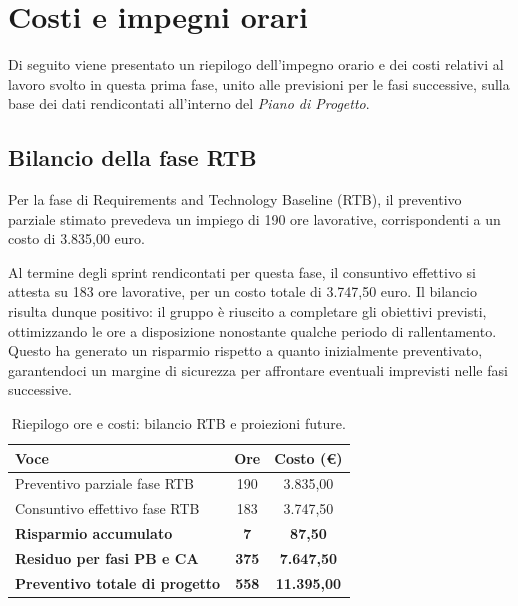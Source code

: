 \documentclass[11pt,a4paper]{article}
\begin{document}
\newpage
\section{Costi e impegni orari}
Di seguito viene presentato un riepilogo dell'impegno orario e dei costi relativi al lavoro svolto in questa prima fase, unito alle previsioni per le fasi successive, sulla base dei dati rendicontati all'interno del \textit{Piano di Progetto}.

\subsection*{Bilancio della fase RTB}
Per la fase di Requirements and Technology Baseline (RTB), il preventivo parziale stimato prevedeva un impiego di 190 ore lavorative, corrispondenti a un costo di 3.835,00 euro. 

Al termine degli sprint rendicontati per questa fase, il consuntivo effettivo si attesta su 183 ore lavorative, per un costo totale di 3.747,50 euro. Il bilancio risulta dunque positivo: il gruppo è riuscito a completare gli obiettivi previsti, ottimizzando le ore a disposizione nonostante qualche periodo di rallentamento. Questo ha generato un risparmio rispetto a quanto inizialmente preventivato, garantendoci un margine di sicurezza per affrontare eventuali imprevisti nelle fasi successive.

\begin{table}[H]
    \centering
    \renewcommand{\arraystretch}{1.3} %
    \begin{tabular}{|l|c|c|}
        \hline
        \textbf{Voce} & \textbf{Ore} & \textbf{Costo (€)} \\
        \hline
        Preventivo parziale fase RTB & 190 & 3.835,00 \\
        Consuntivo effettivo fase RTB & 183 & 3.747,50 \\
        \hline
        \textbf{Risparmio accumulato} & \textbf{7} & \textbf{87,50} \\
        \hline\hline
        \textbf{Residuo per fasi PB e CA} & \textbf{375} & \textbf{7.647,50} \\
        \hline
        \textbf{Preventivo totale di progetto} & \textbf{558} & \textbf{11.395,00} \\
        \hline
    \end{tabular}
    \vspace{0.2cm}
    \caption{Riepilogo ore e costi: bilancio RTB e proiezioni future.}
\end{table}
\end{document}
